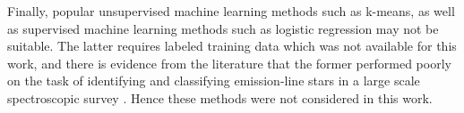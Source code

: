 Finally, popular unsupervised machine learning methods such as k-means, as well as supervised machine learning methods such as logistic regression may not be suitable. The latter requires labeled training data which was not available for this work, and there is evidence from the literature that the former performed poorly on the task of identifying and classifying emission-line stars in a large scale spectroscopic survey \citep{garcia2018machine}. Hence these methods were not considered in this work.

